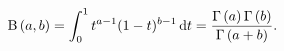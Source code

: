 \[\mathrm{B}\left(a,b\right)=\int_{0}^{1}t^{a-1}(1-t)^{b-1}\,\mathrm{d}t=\frac{%
\Gamma\left(a\right)\Gamma\left(b\right)}{\Gamma\left(a+b\right)}.\]
